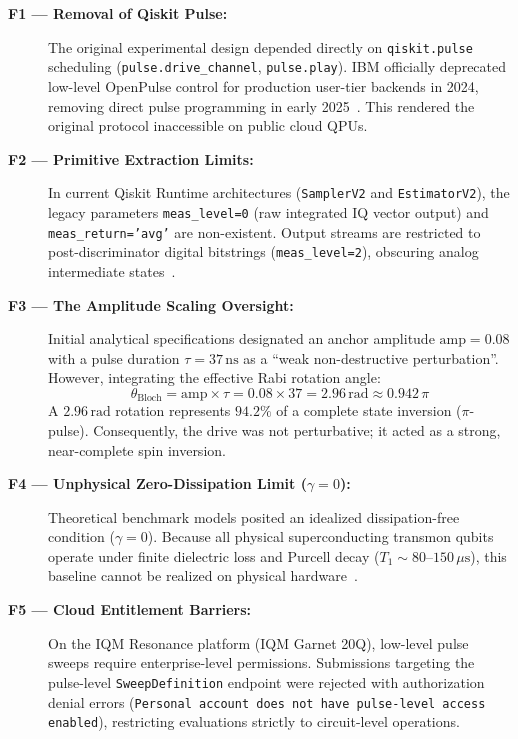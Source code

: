 \documentclass[11pt,a4paper]{article}
\begin{document}
\begin{description}
  \item[\textbf{F1 --- Removal of Qiskit Pulse:}] The original experimental design depended directly on \texttt{qiskit.pulse} scheduling (\texttt{pulse.drive\_channel}, \texttt{pulse.play}). IBM officially deprecated low-level OpenPulse control for production user-tier backends in 2024, removing direct pulse programming in early 2025~\cite{ibm_runtime,qiskit_pulse}. This rendered the original protocol inaccessible on public cloud QPUs.
  \item[\textbf{F2 --- Primitive Extraction Limits:}] In current Qiskit Runtime architectures (\texttt{SamplerV2} and \texttt{EstimatorV2}), the legacy parameters \texttt{meas\_level=0} (raw integrated IQ vector output) and \texttt{meas\_return='avg'} are non-existent. Output streams are restricted to post-discriminator digital bitstrings (\texttt{meas\_level=2}), obscuring analog intermediate states~\cite{ibm_runtime}.
  \item[\textbf{F3 --- The Amplitude Scaling Oversight:}] Initial analytical specifications designated an anchor amplitude $\text{amp} = 0.08$ with a pulse duration $\tau = 37\,\text{ns}$ as a ``weak non-destructive perturbation''. However, integrating the effective Rabi rotation angle:
  \begin{equation}
    \theta_{\text{Bloch}} = \text{amp} \times \tau = 0.08 \times 37 = 2.96\,\text{rad} \approx 0.942\,\pi
  \end{equation}
  A $2.96\,\text{rad}$ rotation represents $94.2\%$ of a complete state inversion ($\pi$-pulse). Consequently, the drive was not perturbative; it acted as a strong, near-complete spin inversion.
  \item[\textbf{F4 --- Unphysical Zero-Dissipation Limit ($\gamma=0$):}] Theoretical benchmark models posited an idealized dissipation-free condition ($\gamma=0$). Because all physical superconducting transmon qubits operate under finite dielectric loss and Purcell decay ($T_1 \sim 80\text{--}150\,\mu\text{s}$), this baseline cannot be realized on physical hardware~\cite{transmon_coherence,bylander2011noise}.
  \item[\textbf{F5 --- Cloud Entitlement Barriers:}] On the IQM Resonance platform (IQM Garnet 20Q), low-level pulse sweeps require enterprise-level permissions. Submissions targeting the pulse-level \texttt{SweepDefinition} endpoint were rejected with authorization denial errors (\texttt{Personal account does not have pulse-level access enabled}), restricting evaluations strictly to circuit-level operations.
\end{description}
\end{document}
